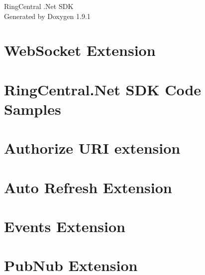 \let\mypdfximage\pdfximage\def\pdfximage{\immediate\mypdfximage}\documentclass[twoside]{book}
\newcommand{\+}{\discretionary{\mbox{\scriptsize$\hookleftarrow$}}{}{}}
\newcommand{\clearemptydoublepage}{%
  \newpage{\pagestyle{empty}\cleardoublepage}%
}
\begin{document}
\raggedbottom

\hypersetup{pageanchor=false,
             bookmarksnumbered=true,
             pdfencoding=unicode
            }
\begin{titlepage}
\vspace*{7cm}
\begin{center}%
{\Large Ring\+Central .Net SDK }\\
\vspace*{1cm}
{\large Generated by Doxygen 1.9.1}\\
\end{center}
\end{titlepage}
\clearemptydoublepage
{}
\tableofcontents
\clearemptydoublepage
{}
\hypersetup{pageanchor=true}

\chapter{Web\+Socket Extension}
\label{md_RingCentral_Net_WebSocket_README}

\chapter{Ring\+Central.\+Net SDK Code Samples}
\label{md_RingCentral_Net_samples}

\chapter{Authorize URI extension}
\label{md_RingCentral_Net_AuthorizeUri_README}

\chapter{Auto Refresh Extension}
\label{md_RingCentral_Net_AutoRefresh_README}

\chapter{Events Extension}
\label{md_RingCentral_Net_Events_README}

\chapter{Pub\+Nub Extension}
\label{md_RingCentral_Net_Pubnub_README}

\end{document}
